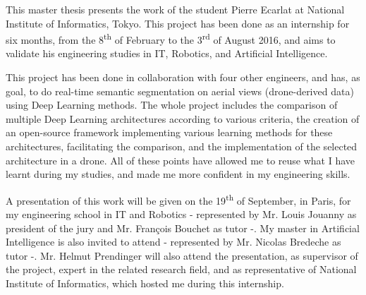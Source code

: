 
\vspace*{2.5cm}

This master thesis presents the work of the student Pierre Ecarlat at National Institute of Informatics, Tokyo. This project has been done as an internship for six months, from the 8\textsuperscript{th} of February to the 3\textsuperscript{rd} of August 2016, and aims to validate his engineering studies in IT, Robotics, and Artificial Intelligence.

This project has been done in collaboration with four other engineers, and has, as goal, to do real-time semantic segmentation on aerial views (drone-derived data) using Deep Learning methods. The whole project includes the comparison of multiple Deep Learning architectures according to various criteria, the creation of an open-source framework implementing various learning methods for these architectures, facilitating the comparison, and the implementation of the selected architecture in a drone. All of these points have allowed me to reuse what I have learnt during my studies, and made me more confident in my engineering skills.

A presentation of this work will be given on the 19\textsuperscript{th} of September, in Paris, for my engineering school in IT and Robotics - represented by Mr. Louis Jouanny as president of the jury and Mr. François Bouchet as tutor -. My master in Artificial Intelligence is also invited to attend - represented by Mr. Nicolas Bredeche as tutor -. Mr. Helmut Prendinger will also attend the presentation, as supervisor of the project, expert in the related research field, and as representative of National Institute of Informatics, which hosted me during this internship.